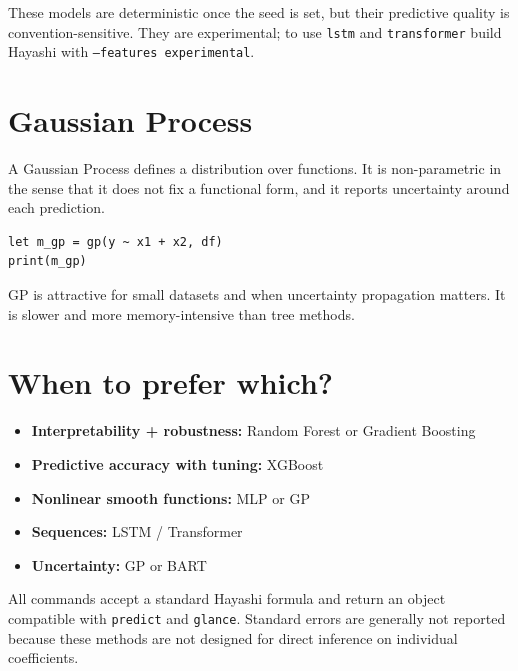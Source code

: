 These models are deterministic once the seed is set, but their
predictive quality is convention-sensitive. They are experimental; to use
\texttt{lstm} and \texttt{transformer} build Hayashi with \texttt{--features experimental}.

\section{Gaussian Process}

A Gaussian Process defines a distribution over functions. It is
non-parametric in the sense that it does not fix a functional form, and
it reports uncertainty around each prediction.

\begin{lstlisting}[caption={Gaussian process regression}]
let m_gp = gp(y ~ x1 + x2, df)
print(m_gp)
\end{lstlisting}

GP is attractive for small datasets and when uncertainty propagation
matters. It is slower and more memory-intensive than tree methods.

\section{When to prefer which?}

\begin{itemize}
\item \textbf{Interpretability + robustness:} Random Forest or Gradient Boosting
\item \textbf{Predictive accuracy with tuning:} XGBoost
\item \textbf{Nonlinear smooth functions:} MLP or GP
\item \textbf{Sequences:} LSTM / Transformer
\item \textbf{Uncertainty:} GP or BART
\end{itemize}

All commands accept a standard Hayashi formula and return an object
compatible with \texttt{predict} and \texttt{glance}. Standard errors are generally not
reported because these methods are not designed for direct inference on
individual coefficients.
